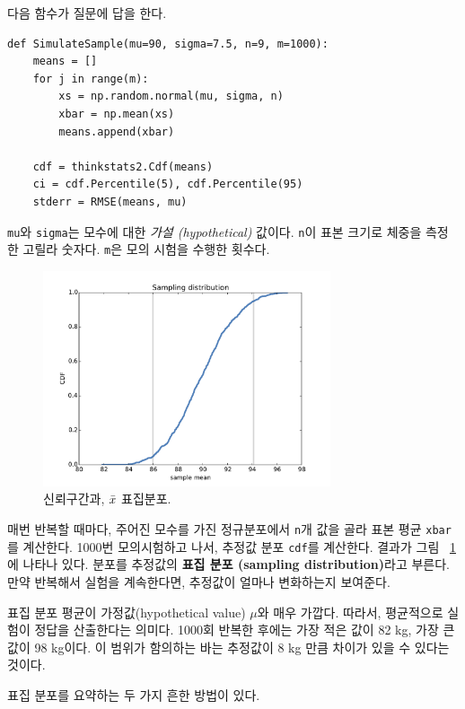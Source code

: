다음 함수가 질문에 답을 한다.

\begin{verbatim}
def SimulateSample(mu=90, sigma=7.5, n=9, m=1000):
    means = []
    for j in range(m):
        xs = np.random.normal(mu, sigma, n)
        xbar = np.mean(xs)
        means.append(xbar)

    cdf = thinkstats2.Cdf(means)
    ci = cdf.Percentile(5), cdf.Percentile(95)
    stderr = RMSE(means, mu)
\end{verbatim}

{\tt mu}와 {\tt sigma}는 모수에 대한 {\em 가설 (hypothetical)} 값이다.
{\tt n}이 표본 크기로 체중을 측정한 고릴라 숫자다.
{\tt m}은 모의 시험을 수행한 횟수다.

\begin{figure}
\centerline{\includegraphics[height=2.5in]{figs/estimation1.pdf}}
\caption{신뢰구간과, $\bar{x}$ 표집분포.}
\label{estimation1}
\end{figure}

매번 반복할 때마다, 주어진 모수를 가진 정규분포에서 {\tt n}개 값을 골라 
표본 평균 {\tt xbar}를 계산한다. 1000번 모의시험하고 나서, 추정값 분포 {\tt cdf}를 계산한다. 결과가 그림 ~\ref{estimation1}에 나타나 있다.
분포를 추정값의 {\bf 표집 분포 (sampling distribution)}라고 부른다.
만약 반복해서 실험을 계속한다면, 추정값이 얼마나 변화하는지 보여준다.

표집 분포 평균이 가정값(hypothetical value) $\mu$와 매우 가깝다.
따라서, 평균적으로 실험이 정답을 산출한다는 의미다.
1000회 반복한 후에는 가장 적은 값이 82 kg, 가장 큰 값이 98 kg이다.
이 범위가 함의하는 바는 추정값이 8 kg 만큼 차이가 있을 수 있다는 것이다.

표집 분포를 요약하는 두 가지 흔한 방법이 있다.

